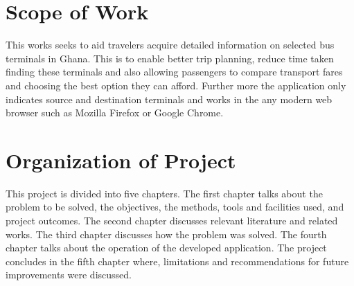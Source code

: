 \section{Scope of Work}
This works seeks to aid travelers acquire detailed information on selected bus terminals in Ghana. This is to enable better trip planning, reduce time taken finding these terminals and also allowing passengers to compare transport fares and choosing the best option they can afford.
Further more the application only indicates source and destination terminals and works in the any modern web browser such as Mozilla Firefox or Google Chrome.

\section{Organization of Project}
This project is divided into five chapters. The first chapter talks about the problem to be solved, the objectives, the methods, tools and facilities used, and project outcomes. The second chapter discusses relevant literature and related works. The third chapter discusses how the problem was solved. The fourth chapter talks about the operation of the developed application. The project concludes in the fifth chapter where, limitations and recommendations for future improvements were discussed.

